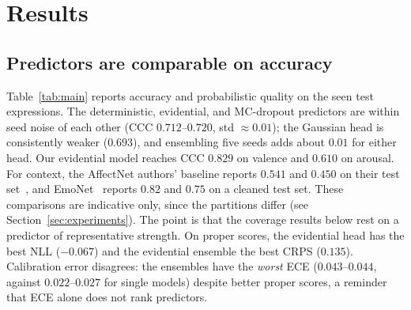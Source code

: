 \section{Results}
\label{sec:results}


\subsection{Predictors are comparable on accuracy}
Table~\ref{tab:main} reports accuracy and probabilistic quality on the seen test
expressions. The deterministic, evidential, and MC-dropout predictors are within
seed noise of each other (CCC $0.712$--$0.720$, std $\approx0.01$); the Gaussian
head is consistently weaker ($0.693$), and ensembling five seeds adds about
$0.01$ for either head. Our evidential model reaches CCC $0.829$ on valence and
$0.610$ on arousal. For context, the AffectNet authors' baseline reports
$0.541$ and $0.450$ on their test set~\cite{mollahosseini2017affectnet}, and
EmoNet~\cite{toisoul2021estimation} reports $0.82$ and $0.75$ on a cleaned test
set. These comparisons are indicative only, since the partitions differ (see
Section~\ref{sec:experiments}). The point is that the coverage results below rest
on a predictor of representative strength. On proper scores, the evidential head
has the best NLL ($-0.067$) and the evidential ensemble the best CRPS
($0.135$). Calibration error disagrees: the ensembles have the \emph{worst} ECE
($0.043$--$0.044$, against $0.022$--$0.027$ for single models) despite better
proper scores, a reminder that ECE alone does not rank predictors.

\begin{table}[h]
  \centering\small
  \resizebox{\linewidth}{!}{}
  \caption{Accuracy and probabilistic quality on seen test expressions.
  Mean$_{\pm\text{std}}$ over five seeds; ensembles combine the five seeds.
  NLL and CRPS are proper scores (lower is better).}
  \label{tab:main}
\end{table}

